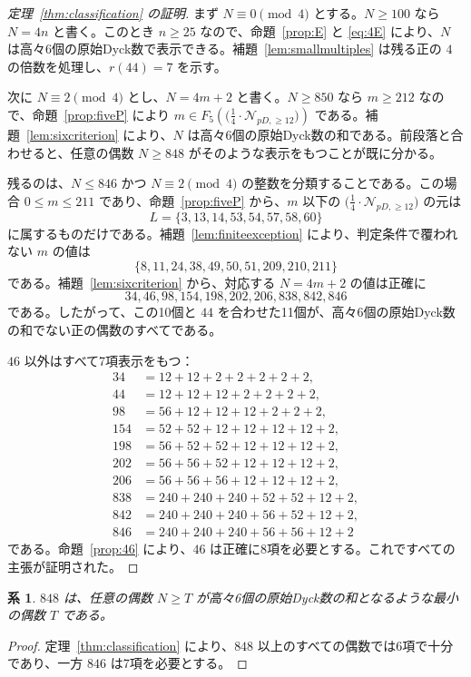 \documentclass[12pt]{ltjsarticle}
\theoremstyle{plain}
\newtheorem{corollary}[theorem]{系}
\theoremstyle{definition}
\theoremstyle{plain}
\newcommand{\Pset}{
  \bigl(\tfrac{1}{4}\cdot\mathcal{N}_{pD,\geq 12}\bigr)
}
\begin{document}
\begin{proof}[定理~\ref{thm:classification} の証明]
まず $N\equiv0\pmod4$ とする。$N\geq100$ なら $N=4n$ と書く。このとき $n\geq25$ なので、命題~\ref{prop:E} と \eqref{eq:4E} により、$N$ は高々6個の原始Dyck数で表示できる。補題~\ref{lem:smallmultiples} は残る正の $4$ の倍数を処理し、$r(44)=7$ を示す。

次に $N\equiv2\pmod4$ とし、$N=4m+2$ と書く。$N\geq850$ なら $m\geq212$ なので、命題~\ref{prop:fiveP} により $m\in F_5(\Pset)$ である。補題~\ref{lem:sixcriterion} により、$N$ は高々6個の原始Dyck数の和である。前段落と合わせると、任意の偶数 $N\geq848$ がそのような表示をもつことが既に分かる。

残るのは、$N\leq846$ かつ $N\equiv2\pmod4$ の整数を分類することである。この場合 $0\leq m\leq211$ であり、命題~\ref{prop:fiveP} から、$m$ 以下の $\Pset$ の元は
\[
 L=\{3,13,14,53,54,57,58,60\}
\]
に属するものだけである。補題~\ref{lem:finiteexception} により、判定条件で覆われない $m$ の値は
\[
 \{8,11,24,38,49,50,51,209,210,211\}
\]
である。補題~\ref{lem:sixcriterion} から、対応する $N=4m+2$ の値は正確に
\[
 34,46,98,154,198,202,206,838,842,846
\]
である。したがって、この10個と $44$ を合わせた11個が、高々6個の原始Dyck数の和でない正の偶数のすべてである。

$46$ 以外はすべて7項表示をもつ：
\[
\begin{aligned}
34&=12+12+2+2+2+2+2,\\
44&=12+12+12+2+2+2+2,\\
98&=56+12+12+12+2+2+2,\\
154&=52+52+12+12+12+12+2,\\
198&=56+52+52+12+12+12+2,\\
202&=56+56+52+12+12+12+2,\\
206&=56+56+56+12+12+12+2,\\
838&=240+240+240+52+52+12+2,\\
842&=240+240+240+56+52+12+2,\\
846&=240+240+240+56+56+12+2
\end{aligned}
\]
である。命題~\ref{prop:46} により、$46$ は正確に8項を必要とする。これですべての主張が証明された。
\end{proof}

\begin{corollary}\label{cor:threshold}
$848$ は、任意の偶数 $N\geq T$ が高々6個の原始Dyck数の和となるような最小の偶数 $T$ である。
\end{corollary}

\begin{proof}
定理~\ref{thm:classification} により、$848$ 以上のすべての偶数では6項で十分であり、一方 $846$ は7項を必要とする。
\end{proof}
\end{document}
